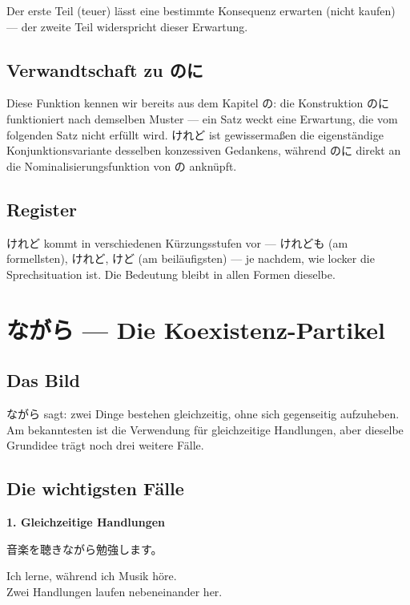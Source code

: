 \documentclass[12pt]{book}
\begin{document}
Der erste Teil (teuer) lässt eine bestimmte Konsequenz erwarten (nicht kaufen) — der zweite Teil widerspricht dieser Erwartung.

\section*{Verwandtschaft zu のに}

Diese Funktion kennen wir bereits aus dem Kapitel の: die Konstruktion のに funktioniert nach demselben Muster — ein Satz weckt eine Erwartung, die vom folgenden Satz nicht erfüllt wird. けれど ist gewissermaßen die eigenständige Konjunktionsvariante desselben konzessiven Gedankens, während のに direkt an die Nominalisierungsfunktion von の anknüpft.

\section*{Register}

けれど kommt in verschiedenen Kürzungsstufen vor — けれども (am formellsten), けれど, けど (am beiläufigsten) — je nachdem, wie locker die Sprechsituation ist. Die Bedeutung bleibt in allen Formen dieselbe.


\chapter{ながら — Die Koexistenz-Partikel}

\section*{Das Bild}

ながら sagt: zwei Dinge bestehen gleichzeitig, ohne sich gegenseitig aufzuheben. Am bekanntesten ist die Verwendung für gleichzeitige Handlungen, aber dieselbe Grundidee trägt noch drei weitere Fälle.

\section*{Die wichtigsten Fälle}

\textbf{1. Gleichzeitige Handlungen}
\par\quad 音楽を聴きながら勉強します。\\
\par\quad Ich lerne, während ich Musik höre.\\

Zwei Handlungen laufen nebeneinander her.
\end{document}
